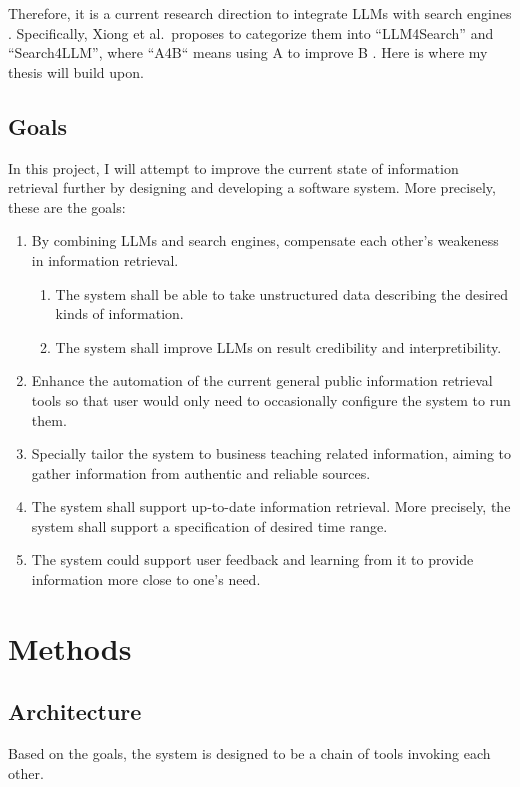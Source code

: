 \documentclass[project-plan]{report-template}
\begin{document}
Therefore, it is a current research direction to integrate LLMs with search
engines \cite{llm.meet.search.1, llm.meet.search.2, llm.meet.search.3}.
Specifically, Xiong et al.\ proposes to categorize them into ``LLM4Search'' and
``Search4LLM'', where ``A4B`` means using A to improve B
\cite{llm.meet.search.1}. Here is where my thesis will build upon.  

\subsection{Goals}
In this project, I will attempt to improve the current state of information
retrieval further by designing and developing a software system. More
precisely, these are the goals:
\begin{enumerate}
	\item By combining LLMs and search engines, compensate each other's
		weakeness in information retrieval.
		\begin{enumerate}
		\item The system shall be able to take unstructured data describing the
		desired kinds of information.
		\item The system shall improve LLMs on result credibility and
			interpretibility. 
		\end{enumerate}
	\item Enhance the automation of the current general public information
		retrieval tools so that	user would only need to occasionally configure
		the system to run them.
	\item Specially tailor the system to business teaching related information,
		aiming to gather information from authentic and reliable sources.
	\item The system shall support up-to-date information retrieval. More
		precisely, the system shall support a specification of desired time
		range.	
	\item The system could support user feedback and learning from it to
		provide information more close to one's need.
\end{enumerate}

\section{Methods} 
\subsection{Architecture}
Based on the goals, the system is designed to be a chain of tools invoking each
other.
\end{document}
